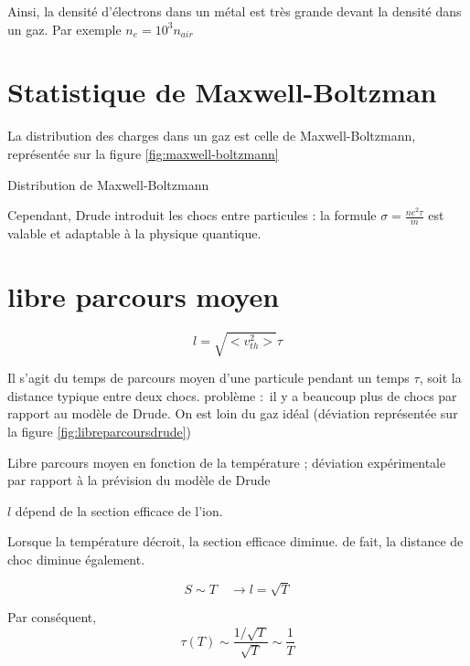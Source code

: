 Ainsi, la densité d'électrons dans un métal est très grande devant la densité dans un gaz. Par exemple $n_e = 10^3 n_{air}$

\section{Statistique de Maxwell-Boltzman}

La distribution des charges dans un gaz est celle de Maxwell-Boltzmann, représentée sur la figure \ref{fig:maxwell-boltzmann}

\begin{marginfigure}
\TODO
\caption{Distribution de Maxwell-Boltzmann}
\label{fig:maxwell-boltzmann}
\end{marginfigure}

Cependant, Drude introduit les chocs entre particules : la formule $\sigma = \frac{ne^2\tau}{m}$ est valable et adaptable à la physique quantique.

\section{libre parcours moyen}

\begin{equation}
l = \sqrt{<v_{th}^2>} \tau
\end{equation}

Il s'agit du temps de parcours moyen d'une particule pendant un temps $\tau$, soit la distance typique entre deux chocs.
problème : il y a beaucoup plus de chocs par rapport au modèle de Drude. On est loin du gaz idéal (déviation représentée sur la figure \ref{fig:libreparcoursdrude})

\begin{marginfigure}
\TODO
\caption{Libre parcours moyen en fonction de la température ; déviation expérimentale par rapport à la prévision du modèle de Drude}
\label{fig:libreparcoursdrude}
\end{marginfigure}

$l$ dépend de la section efficace de l'ion.

Lorsque la température décroit, la section efficace diminue. de fait, la distance de choc diminue également.

\begin{equation}
S \sim T\quad \rightarrow l=\sqrt{T}
\end{equation}

Par conséquent,
\begin{equation}
\tau(T) \sim \frac{1/\sqrt{T}}{\sqrt{T}} \sim \frac{1}{T}
\end{equation}

